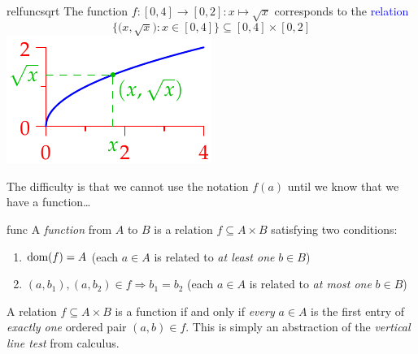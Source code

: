 \begin{example}[lower separated=false, sidebyside, sidebyside align=top seam, sidebyside gap=0pt, righthand width=0.3\linewidth]{}{relfuncsqrt}
	The function $f:[0,4]\to[0,2]:x\mapsto \sqrt x$ corresponds to the \textcolor{blue}{relation}
	\[
		\bigl\{\bigl(x,\sqrt x\bigr):x\in [0,4]\bigr\} 
		\subseteq [0,4]\times [0,2]
	\]
	\tcblower
	\hfill
	\includegraphics{relations-20-reln3}
\end{example}

The difficulty is that we cannot use the notation $f(a)$ until we know that we have a function\ldots

\begin{defn}{}{func}
	A \emph{function} from $A$ to $B$ is a relation $f\subseteq A\times B$ satisfying two conditions:
	\begin{enumerate}
	  \item $\operatorname{dom}(f)=A$ \hfill (each $a\in A$ is related to \emph{at least one} $b\in B$)
	  \item $(a,b_1),(a,b_2)\in f\Longrightarrow b_1=b_2$ \hfill (each $a\in A$ is related to \emph{at most one} $b\in B$)
	\end{enumerate}
\end{defn}

A relation $f\subseteq A\times B$ is a function if and only if \emph{every} $a\in A$ is the first entry of \emph{exactly one} ordered pair $(a,b)\in f$. This is simply an abstraction of the \emph{vertical line test} from calculus.

